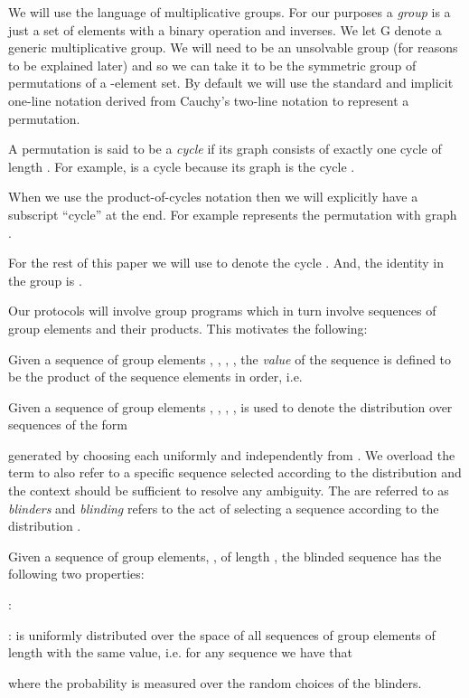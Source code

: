 We will use the language  of multiplicative groups. For our purposes a
\emph{group} is a  just a set of elements with  a binary operation and
inverses. We  let G  denote a generic  multiplicative group.   We will
need  to be an unsolvable group (for reasons to be explained later)
and so we can take it  to be  the symmetric group of permutations
of  a  -element set.   By  default we  will  use  the standard  and
implicit  one-line notation  derived from  Cauchy's  two-line notation
\cite{WikiPermNotation} to represent a permutation.
\begin{definition} [Cycle]
A permutation   is said  to be a \emph{cycle}  if its graph
consists of  exactly one cycle of length  . For example,   is a  cycle  because its  graph  is the  cycle  .
\end{definition}

When  we use the  product-of-cycles notation  then we  will explicitly
have a subscript ``cycle'' at the end.   For example  represents the permutation 
with graph .

For the rest of this paper we  will use  to denote the
cycle . And, the identity in the group is .

Our  protocols  will involve  group  programs  which  in turn  involve
sequences  of group elements  and their  products. This  motivates the
following:

\begin{definition}
Given a sequence  of  group elements , , , ,
the {\em value} of the sequence  is defined to be the
product of the sequence elements in order, i.e.

\end{definition}

\begin{definition}[Blinding]
Given a sequence  of  group elements , , , ,
 is used to denote the distribution over sequences of
the form
 
generated by choosing each  uniformly
and independently from .  We overload the term  to
also  refer   to  a  specific  sequence  selected   according  to  the
distribution  and the context should be sufficient to
resolve any  ambiguity.  The   are referred to as  {\em blinders}
and  {\em blinding}   refers  to the  act of  selecting  a sequence
according to the distribution .
\end{definition}

\begin{lemma}
\label{lemma:blindinglemma}
Given a  sequence of group elements,  , of length  , the blinded
sequence  has the following two properties:

:  

:    is uniformly
distributed  over the  space of  all  sequences of  group elements  of
length   with the  same value,  i.e. for any  sequence  we have that
 
where  the probability  is measured  over  the random  choices of  the
blinders.
\end{lemma}

